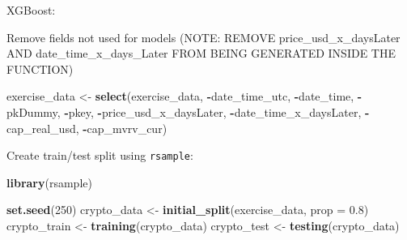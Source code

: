 \documentclass[
]{book}
\newenvironment{Shaded}{\begin{snugshade}}{\end{snugshade}}
\newcommand{\DataTypeTok}[1]{\textcolor[rgb]{0.13,0.29,0.53}{#1}}
\newcommand{\DecValTok}[1]{\textcolor[rgb]{0.00,0.00,0.81}{#1}}
\newcommand{\FloatTok}[1]{\textcolor[rgb]{0.00,0.00,0.81}{#1}}
\newcommand{\KeywordTok}[1]{\textcolor[rgb]{0.13,0.29,0.53}{\textbf{#1}}}
\newcommand{\NormalTok}[1]{#1}
\newcommand{\OperatorTok}[1]{\textcolor[rgb]{0.81,0.36,0.00}{\textbf{#1}}}
\newcommand{\StringTok}[1]{\textcolor[rgb]{0.31,0.60,0.02}{#1}}
\begin{document}
\begin{Shaded}
\end{Shaded}

XGBoost:

\begin{Shaded}
\end{Shaded}

Remove fields not used for models (NOTE: REMOVE price\_usd\_x\_daysLater AND date\_time\_x\_days\_Later FROM BEING GENERATED INSIDE THE FUNCTION)

\begin{Shaded}
\begin{Highlighting}[]
\NormalTok{exercise_data <-}\StringTok{ }\KeywordTok{select}\NormalTok{(exercise_data, }\OperatorTok{-}\NormalTok{date_time_utc, }\OperatorTok{-}\NormalTok{date_time, }\OperatorTok{-}\NormalTok{pkDummy, }\OperatorTok{-}\NormalTok{pkey, }\OperatorTok{-}\NormalTok{price_usd_x_daysLater, }\OperatorTok{-}\NormalTok{date_time_x_daysLater, }\OperatorTok{-}\NormalTok{cap_real_usd, }\OperatorTok{-}\NormalTok{cap_mvrv_cur)}
\end{Highlighting}
\end{Shaded}

Create train/test split using \texttt{rsample}\citep{R-rsample}:

\begin{Shaded}
\begin{Highlighting}[]
\KeywordTok{library}\NormalTok{(rsample)}

\KeywordTok{set.seed}\NormalTok{(}\DecValTok{250}\NormalTok{)}
\NormalTok{crypto_data <-}\StringTok{ }\KeywordTok{initial_split}\NormalTok{(exercise_data, }\DataTypeTok{prop =} \FloatTok{0.8}\NormalTok{)}
\NormalTok{crypto_train <-}\StringTok{ }\KeywordTok{training}\NormalTok{(crypto_data)}
\NormalTok{crypto_test  <-}\StringTok{  }\KeywordTok{testing}\NormalTok{(crypto_data)}
\end{Highlighting}
\end{Shaded}
\end{document}
